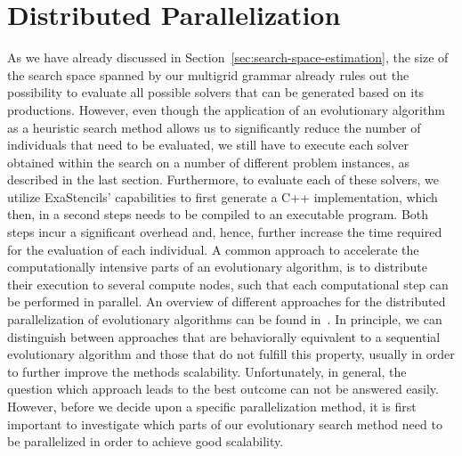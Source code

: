 \section{Distributed Parallelization}
As we have already discussed in Section~\ref{sec:search-space-estimation}, the size of the search space spanned by our multigrid grammar already rules out the possibility to evaluate all possible solvers that can be generated based on its productions.
However, even though the application of an evolutionary algorithm as a heuristic search method allows us to significantly reduce the number of individuals that need to be evaluated, we still have to execute each solver obtained within the search on a number of different problem instances, as described in the last section.
Furthermore, to evaluate each of these solvers, we utilize ExaStencils' capabilities to first generate a C++ implementation, which then, in a second steps needs to be compiled to an executable program.
Both steps incur a significant overhead and, hence, further increase the time required for the evaluation of each individual.
A common approach to accelerate the computationally intensive parts of an evolutionary algorithm, is to distribute their execution to several compute nodes, such that each computational step can be performed in parallel.
An overview of different approaches for the distributed parallelization of evolutionary algorithms can be found in~\cite{gong2015distributed}.
In principle, we can distinguish between approaches that are behaviorally equivalent to a sequential evolutionary algorithm and those that do not fulfill this property, usually in order to further improve the methods scalability.
Unfortunately, in general, the question which approach leads to the best outcome can not be answered easily.
However, before we decide upon a specific parallelization method, it is first important to investigate which parts of our evolutionary search method need to be parallelized in order to achieve good scalability.


